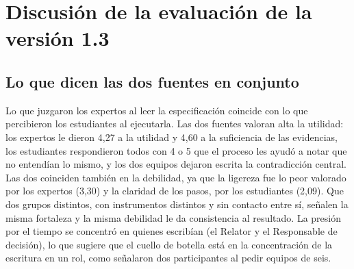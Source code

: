 \documentclass[12pt,letterpaper,oneside]{report}
\begin{document}
\section{Discusión de la evaluación de la versión 1.3}
\label{sec:discusion}

\subsection{Lo que dicen las dos fuentes en conjunto}
Lo que juzgaron los expertos al leer la especificación coincide con lo que
percibieron los estudiantes al ejecutarla. Las dos fuentes valoran alta la
utilidad: los expertos le dieron 4,27 a la utilidad y 4,60 a la suficiencia de
las evidencias, los estudiantes respondieron todos con 4 o 5 que el proceso les
ayudó a notar que no entendían lo mismo, y los dos equipos dejaron escrita la
contradicción central. Las dos coinciden también en la debilidad, ya que la
ligereza fue lo peor valorado por los expertos (3,30) y la claridad de los
pasos, por los estudiantes (2,09). Que dos grupos distintos, con instrumentos
distintos y sin contacto entre sí, señalen la misma fortaleza y la misma
debilidad le da consistencia al resultado. La presión por el tiempo se
concentró en quienes escribían (el Relator y el Responsable de decisión), lo que
sugiere que el cuello de botella está en la concentración de la escritura en un
rol, como señalaron dos participantes al pedir equipos de seis.
\end{document}
